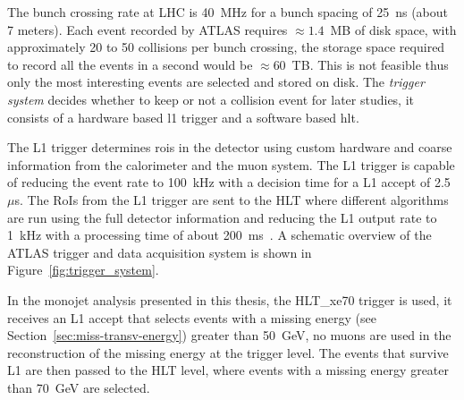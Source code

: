 The bunch crossing rate at LHC is 40~MHz for a bunch spacing of 25~ns (about 7
meters). Each event recorded by ATLAS requires $\approx 1.4$~MB of disk space,
with approximately 20 to 50 collisions per bunch crossing, the storage space
required to record all the events in a second would be $\approx 60$~TB. This is
not feasible thus only the most interesting events are selected and stored on
disk. The \emph{trigger system} decides whether to keep or not a collision event
for later studies, it consists of a hardware based \gls{l1} trigger and a
software based \gls{hlt}.

The L1 trigger determines \gls{rois} in the detector using custom hardware and
coarse information from the calorimeter and the muon system. The L1 trigger is
capable of reducing the event rate to 100~kHz with a decision time for a L1
accept of 2.5~$\mu$s. The RoIs from the L1 trigger are sent to the HLT where
different algorithms are run using the full detector information and reducing
the L1 output rate to 1~kHz with a processing time of about
200~ms~\cite{trigger}. A schematic overview of the ATLAS trigger and data
acquisition system is shown in Figure~\ref{fig:trigger_system}.

In the monojet analysis presented in this thesis, the HLT\_xe70 trigger is used,
it receives an L1 accept that selects events with a missing energy (see
Section~\ref{sec:miss-transv-energy}) greater than 50~GeV, no muons are used in
the reconstruction of the missing energy at the trigger level. The events that
survive L1 are then passed to the HLT level, where events with a missing energy
greater than 70~GeV are selected.
